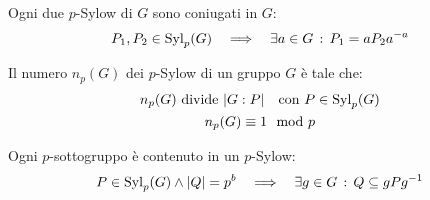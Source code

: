 \begin{teorema}
    Ogni due $p$-Sylow di $G$ sono coniugati in $G$:
    \begin{equation*}
        P_1, P_2 \in \operatorname{Syl}_p(G) \quad\Longrightarrow\quad \exists a \in G \,:\, P_1 = a P_2 a^{-a}
    \end{equation*}

    Il numero $n_p(G)$ dei $p$-Sylow di un gruppo $G$ è tale che:
    \begin{gather*}
        n_p(G) \text{ divide } \lvert G:P \rvert \quad \text{con } P \in \operatorname{Syl}_p(G) \\
        n_p(G) \equiv 1 \mod p
    \end{gather*}

    Ogni $p$-sottogruppo è contenuto in un $p$-Sylow:
    \begin{equation*}
        P \in \operatorname{Syl}_p(G) \land \lvert Q \rvert = p^b \quad\Longrightarrow\quad \exists g \in G \,:\, Q \subseteq gPg^{-1}
    \end{equation*}
\end{teorema}
